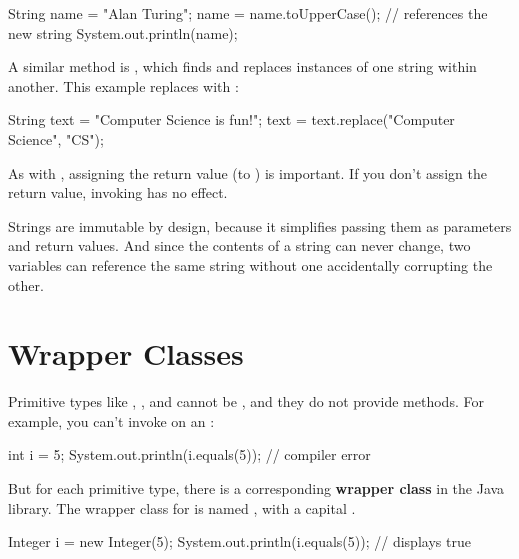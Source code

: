 \begin{code}
String name = "Alan Turing";
name = name.toUpperCase();    // references the new string
System.out.println(name);
\end{code}


A similar method is , which finds and replaces instances of one string within another.
This example replaces  with :

\begin{code}
String text = "Computer Science is fun!";
text = text.replace("Computer Science", "CS");
\end{code}


As with , assigning the return value (to ) is important.
If you don't assign the return value, invoking  has no effect.

Strings are immutable by design, because it simplifies passing them as parameters and return values.
And since the contents of a string can never change, two variables can reference the same string without one accidentally corrupting the other.


\section{Wrapper Classes}

Primitive types like , , and  cannot be , and they do not provide methods.
For example, you can't invoke  on an :

\begin{code}
int i = 5;
System.out.println(i.equals(5));  // compiler error
\end{code}


But for each primitive type, there is a corresponding {\bf wrapper class} in the Java library.
The wrapper class for  is named , with a capital .

\begin{code}
Integer i = new Integer(5);
System.out.println(i.equals(5));  // displays true
\end{code}

